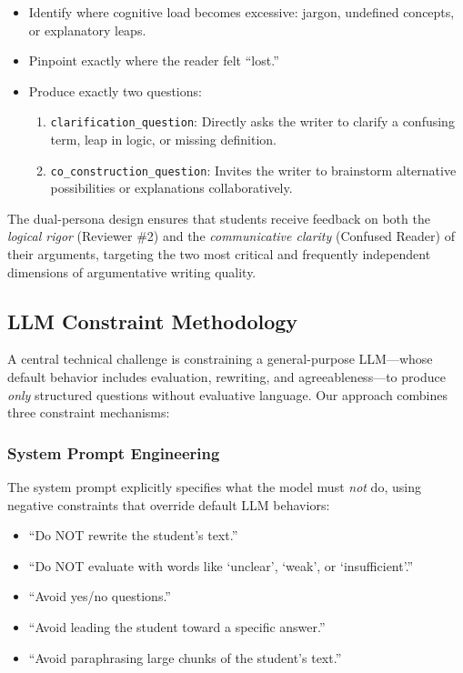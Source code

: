 \documentclass[11pt,a4paper]{article}
\begin{document}
\begin{itemize}[leftmargin=*]
    \item Identify where cognitive load becomes excessive: jargon, undefined concepts, or explanatory leaps.
    \item Pinpoint exactly where the reader felt ``lost.''
    \item Produce exactly two questions:
    \begin{enumerate}
        \item \texttt{clarification\_question}: Directly asks the writer to clarify a confusing term, leap in logic, or missing definition.
        \item \texttt{co\_construction\_question}: Invites the writer to brainstorm alternative possibilities or explanations collaboratively.
    \end{enumerate}
\end{itemize}

The dual-persona design ensures that students receive feedback on both the \textit{logical rigor} (Reviewer \#2) and the \textit{communicative clarity} (Confused Reader) of their arguments, targeting the two most critical and frequently independent dimensions of argumentative writing quality.

\subsection{LLM Constraint Methodology}

A central technical challenge is constraining a general-purpose LLM---whose default behavior includes evaluation, rewriting, and agreeableness---to produce \textit{only} structured questions without evaluative language. Our approach combines three constraint mechanisms:

\subsubsection{System Prompt Engineering}

The system prompt explicitly specifies what the model must \textit{not} do, using negative constraints that override default LLM behaviors:

\begin{itemize}[leftmargin=*]
    \item ``Do NOT rewrite the student's text.''
    \item ``Do NOT evaluate with words like `unclear', `weak', or `insufficient'.''
    \item ``Avoid yes/no questions.''
    \item ``Avoid leading the student toward a specific answer.''
    \item ``Avoid paraphrasing large chunks of the student's text.''
\end{itemize}
\end{document}

